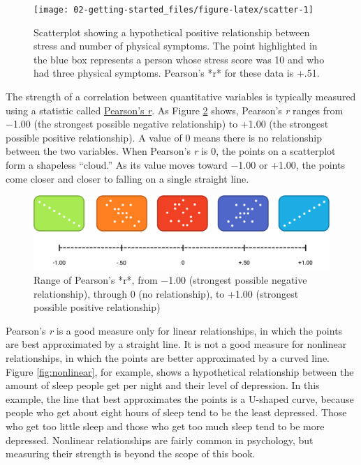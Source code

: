 \documentclass[
]{krantz}
\begin{document}
\begin{figure}

{\centering \texttt{[image: 02-getting-started\_files/figure-latex/scatter-1]} 

}

\caption{Scatterplot showing a hypothetical positive relationship between stress and number of physical symptoms. The point highlighted in the blue box represents a person whose stress score was 10 and who had three physical symptoms. Pearson’s *r* for these data is +.51.}\label{fig:scatter}
\end{figure}

The strength of a correlation between quantitative variables is typically measured using a statistic called \protect\hyperlink{pearsons-r}{Pearson's \emph{r}}. As Figure \ref{fig:pearson} shows, Pearson's \emph{r} ranges from −1.00 (the strongest possible negative relationship) to +1.00 (the strongest possible positive relationship). A value of 0 means there is no relationship between the two variables. When Pearson's \emph{r} is 0, the points on a scatterplot form a shapeless ``cloud.'' As its value moves toward −1.00 or +1.00, the points come closer and closer to falling on a single straight line.

\begin{figure}

{\centering \includegraphics[width=0.9\linewidth]{images/getting-started/pearson} 

}

\caption{Range of Pearson’s *r*, from −1.00 (strongest possible negative relationship), through 0 (no relationship), to +1.00 (strongest possible positive relationship)}\label{fig:pearson}
\end{figure}

Pearson's \emph{r} is a good measure only for linear relationships, in which the points are best approximated by a straight line. It is not a good measure for nonlinear relationships, in which the points are better approximated by a curved line. Figure \ref{fig:nonlinear}, for example, shows a hypothetical relationship between the amount of sleep people get per night and their level of depression. In this example, the line that best approximates the points is a U-shaped curve, because people who get about eight hours of sleep tend to be the least depressed. Those who get too little sleep and those who get too much sleep tend to be more depressed. Nonlinear relationships are fairly common in psychology, but measuring their strength is beyond the scope of this book.
\end{document}
